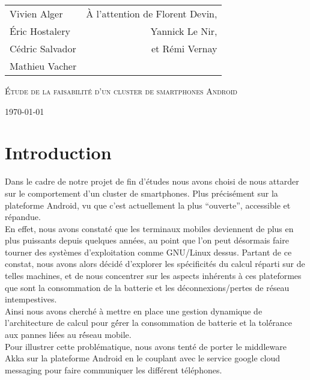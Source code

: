 \documentclass[a4paper,12pt]{article}
\begin{document}
\begin{titlepage}

\addtolength{\oddsidemargin}{-0.15in}
\addtolength{\textwidth}{0.5in}
\addtolength{\topmargin}{-.375in}
\addtolength{\textheight}{0.75in}

\begin{center}

\begin{tabular*}{6in}{l@{\extracolsep{\fill}}r}{Vivien Alger}&{À
    l'attention de Florent Devin,}\\
    {Éric Hostalery}&{Yannick Le Nir,}\\
    {Cédric Salvador}&{et Rémi Vernay}\\
    {Mathieu Vacher}
\end{tabular*}
\vspace*{\fill}

\textsc{\LARGE Étude de la faisabilité
d'un cluster de smartphones Android}\\
\vspace*{\fill}

\today
\end{center}

\end{titlepage}

\tableofcontents
\newpage

\pagestyle{fancy}
\fancyhf{}
\fancyhead[R]{\thepage}
\renewcommand{\footrulewidth}{1pt}
\renewcommand{\headrulewidth}{1pt}
  
\section*{Introduction}
Dans le cadre de notre projet de fin d’études nous avons choisi de nous 
attarder sur le comportement d’un cluster de smartphones. Plus précisément
sur la plateforme Android, vu que c’est actuellement la plus “ouverte”, 
accessible et répandue.\\
En effet, nous avons constaté que les terminaux mobiles deviennent de plus en 
plus puissants depuis quelques années, au point que l’on peut désormais faire 
tourner des systèmes d’exploitation comme GNU/Linux dessus. Partant de ce 
constat, nous avons alors décidé d’explorer les spécificités du calcul réparti
sur de telles machines, et de nous concentrer sur les aspects inhérents à ces 
plateformes que sont la consommation de la batterie et les déconnexions/pertes
 de réseau intempestives.\\
Ainsi nous avons cherché à mettre en place une gestion dynamique de 
l’architecture de calcul pour gé́rer la consommation de batterie et la tolé́rance
aux pannes lié́es au ré́seau mobile.\\
Pour illustrer cette problématique, nous avons tenté de porter le middleware 
Akka sur la plateforme Android en le couplant avec le service google cloud 
messaging pour faire communiquer les différent téléphones.
\newpage
\end{document}
